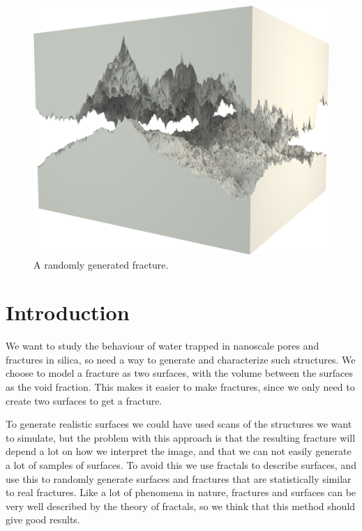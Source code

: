 \vspace*{\fill}
\begin{figure}[hp!]%
\thispagestyle{empty}
    \centering%
    \includegraphics[width=\textwidth]{images/fracture/large_fracture05.jpg}%
    \caption{%
        A randomly generated fracture.%
    }%
\end{figure}%
\vspace{\fill}

\chapter*{Introduction}
We want to study the behaviour of water trapped in nanoscale pores and fractures in silica, so need a way to generate and characterize such structures. We choose to model a fracture as two surfaces, with the volume between the surfaces as the void fraction. This makes it easier to make fractures, since we only need to create two surfaces to get a fracture. 

To generate realistic surfaces we could have used scans of the structures we want to simulate, but the problem with this approach is that the resulting fracture will depend a lot on how we interpret the image, and that we can not easily generate a lot of samples of surfaces. To avoid this we use fractals to describe surfaces, and use this to randomly generate surfaces and fractures that are statistically similar to real fractures. Like a lot of phenomena in nature, fractures and surfaces can be very well described by the theory of fractals\cite{mandelbrot1983fractal}, so we think that this method should give good results.

